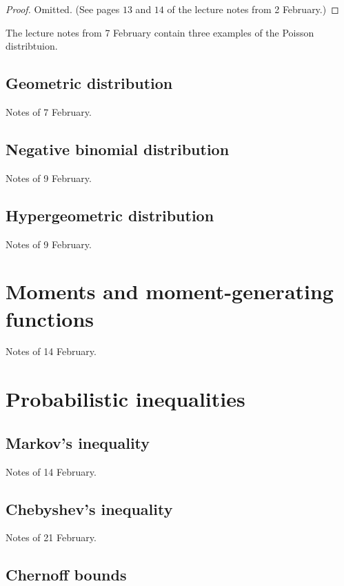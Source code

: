 \documentclass[11pt]{article}
\theoremstyle{definition}
\theoremstyle{remark}
\begin{document}
\begin{proof}
    Omitted. (See pages $13$ and $14$ of the lecture notes from 2 February.)
\end{proof}

The lecture notes from 7 February contain three examples of the Poisson
distribtuion.

\subsection{Geometric distribution}

Notes of 7 February.

\subsection{Negative binomial distribution}

Notes of 9 February.

\subsection{Hypergeometric distribution}

Notes of 9 February.

\section{Moments and moment-generating functions}

Notes of 14 February.

\section{Probabilistic inequalities}

\subsection{Markov's inequality}

Notes of 14 February.

\subsection{Chebyshev's inequality}

Notes of 21 February.

\subsection{Chernoff bounds}
\end{document}
